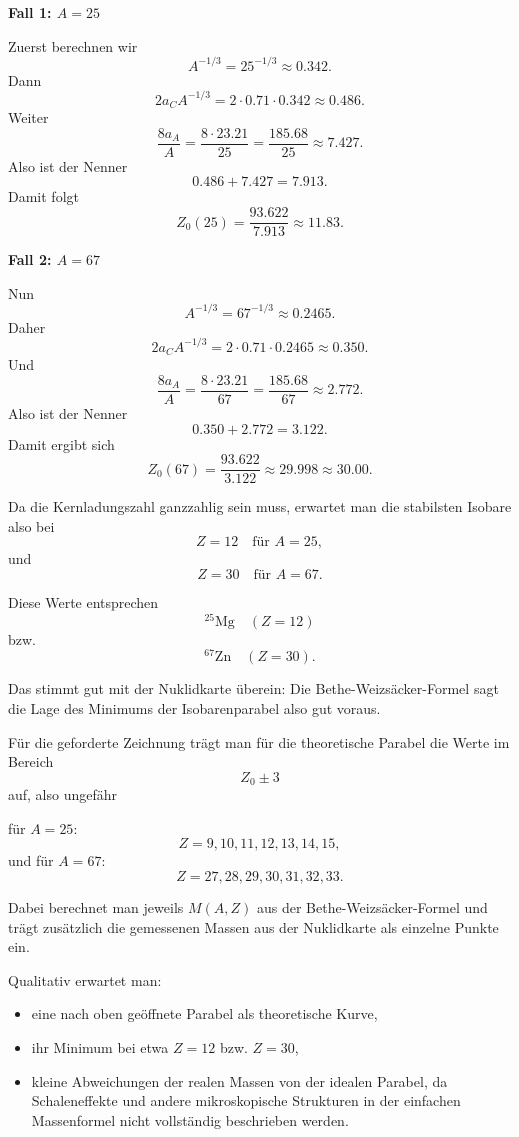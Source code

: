 \documentclass[11pt,a4paper]{scrartcl}
\begin{document}
\begin{enumerate}[label=(\alph*)]
\begin{solutionbox}
        \textbf{Fall 1: $A=25$}

        Zuerst berechnen wir
        \[
            A^{-1/3}=25^{-1/3}\approx 0.342.
        \]
        Dann
        \[
            2a_CA^{-1/3}=2\cdot 0.71\cdot 0.342\approx 0.486.
        \]
        Weiter
        \[
            \frac{8a_A}{A}=\frac{8\cdot 23.21}{25}=\frac{185.68}{25}\approx 7.427.
        \]
        Also ist der Nenner
        \[
            0.486+7.427=7.913.
        \]
        Damit folgt
        \[
            Z_0(25)=\frac{93.622}{7.913}\approx 11.83.
        \]

        \textbf{Fall 2: $A=67$}

        Nun
        \[
            A^{-1/3}=67^{-1/3}\approx 0.2465.
        \]
        Daher
        \[
            2a_CA^{-1/3}=2\cdot 0.71\cdot 0.2465\approx 0.350.
        \]
        Und
        \[
            \frac{8a_A}{A}=\frac{8\cdot 23.21}{67}=\frac{185.68}{67}\approx 2.772.
        \]
        Also ist der Nenner
        \[
            0.350+2.772=3.122.
        \]
        Damit ergibt sich
        \[
            Z_0(67)=\frac{93.622}{3.122}\approx 29.998 \approx 30.00.
        \]

        Da die Kernladungszahl ganzzahlig sein muss, erwartet man die stabilsten Isobare also bei
        \[
            Z=12 \quad \text{für } A=25,
        \]
        und
        \[
            Z=30 \quad \text{für } A=67.
        \]

        Diese Werte entsprechen
        \[
            {}^{25}\mathrm{Mg}\quad (Z=12)
        \]
        bzw.
        \[
            {}^{67}\mathrm{Zn}\quad (Z=30).
        \]

        Das stimmt gut mit der Nuklidkarte überein:
        Die Bethe-Weizsäcker-Formel sagt die Lage des Minimums der Isobarenparabel also gut voraus.

        Für die geforderte Zeichnung trägt man für die theoretische Parabel die Werte im Bereich
        \[
            Z_0\pm 3
        \]
        auf, also ungefähr

        für $A=25$:
        \[
            Z=9,10,11,12,13,14,15,
        \]
        und für $A=67$:
        \[
            Z=27,28,29,30,31,32,33.
        \]

        Dabei berechnet man jeweils $M(A,Z)$ aus der Bethe-Weizsäcker-Formel und trägt zusätzlich die gemessenen Massen aus der Nuklidkarte als einzelne Punkte ein.

        Qualitativ erwartet man:
        \begin{itemize}
            \item eine nach oben geöffnete Parabel als theoretische Kurve,
            \item ihr Minimum bei etwa $Z=12$ bzw. $Z=30$,
            \item kleine Abweichungen der realen Massen von der idealen Parabel, da Schaleneffekte und andere mikroskopische Strukturen in der einfachen Massenformel nicht vollständig beschrieben werden.
        \end{itemize}
    \end{solutionbox}

\end{enumerate}
\end{document}
